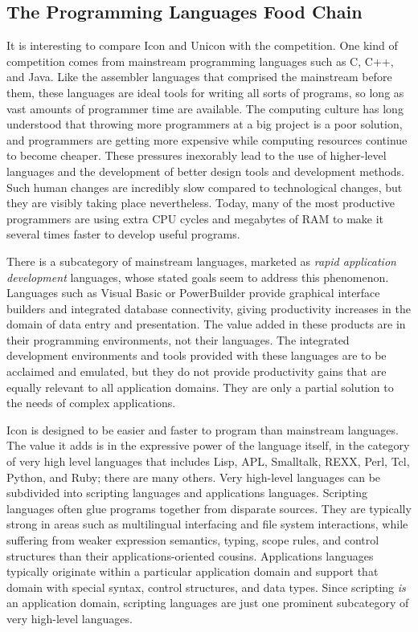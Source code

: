 \subsection{The Programming Languages Food Chain}

It is interesting to compare Icon and Unicon with the competition. One
kind of competition comes from mainstream programming languages
such as C, C++, and Java. Like the assembler languages that
comprised the mainstream before them, these languages are ideal tools
for writing all sorts of programs, so long as vast amounts of
programmer time are available. The computing culture has long
understood that throwing more programmers at a big project is a poor
solution, and programmers are getting more expensive while computing
resources continue to become cheaper. These pressures
inexorably lead to the use of higher-level languages and the
development of better design tools and development methods. Such human
changes are incredibly slow compared to technological changes, but they
are visibly taking place nevertheless. Today, many of the most
productive programmers are using extra CPU cycles and megabytes of RAM
to make it several times faster to develop useful programs.

There is a subcategory of mainstream languages, marketed as \textit{rapid application development}
languages, whose stated goals seem to address this phenomenon.
Languages such as Visual Basic or
PowerBuilder provide
graphical interface builders and integrated database connectivity,
giving productivity increases in the domain of data entry and
presentation. The value added in these products are in their
programming environments, not their languages. The integrated development environments and tools
provided with these languages are to be acclaimed and emulated, but
they do not provide productivity gains that are equally relevant to all
application domains. They are only a partial solution to the needs of
complex applications.

Icon is designed to be easier and faster to program than mainstream
languages. The value it adds is in the expressive power of the language
itself, in the category of very high level languages
that includes Lisp,
APL, Smalltalk, REXX,
Perl, Tcl, Python, and
Ruby; there are
many others. Very high-level languages can be subdivided into
scripting languages and applications
languages. Scripting languages often glue programs
together from disparate sources. They are typically strong in areas
such as multilingual interfacing and file system interactions, while
suffering from weaker expression semantics, typing, scope rules, and
control structures than their applications-oriented cousins.
Applications languages typically originate within a particular
application domain and support that domain with special syntax, control
structures, and data types. Since scripting \textit{is} an application
domain, scripting languages are just one prominent
subcategory of very high-level languages.

